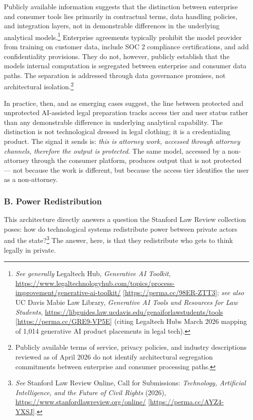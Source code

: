 \documentclass[
  12pt,
]{article}
\begin{document}
Publicly available information suggests that the distinction between
enterprise and consumer tools lies primarily in contractual terms, data
handling policies, and integration layers, not in demonstrable
differences in the underlying analytical models.\footnote{\emph{See
  generally} Legaltech Hub, \emph{Generative AI Toolkit},
  \url{https://www.legaltechnologyhub.com/topics/process-improvement/generative-ai-toolkit/}
  {[}\url{https://perma.cc/98ER-ZTT3}{]}; \emph{see also} UC Davis Mabie
  Law Library, \emph{Generative AI Tools and Resources for Law
  Students},
  \url{https://libguides.law.ucdavis.edu/genaiforlawstudents/tools}
  {[}\url{https://perma.cc/GRE9-VP5E}{]} (citing Legaltech
  Hub\textquotesingle s March 2026 mapping of 1,014 generative AI
  product placements in legal tech).} Enterprise agreements typically
prohibit the model provider from training on customer data, include SOC
2 compliance certifications, and add confidentiality provisions. They do
not, however, publicly establish that the model\textquotesingle s
internal computation is segregated between enterprise and consumer data
paths. The separation is addressed through data governance promises, not
architectural isolation.\footnote{Publicly available terms of service,
  privacy policies, and industry descriptions reviewed as of April 2026
  do not identify architectural segregation commitments between
  enterprise and consumer processing paths.}

In practice, then, and as emerging cases suggest, the line between
protected and unprotected AI-assisted legal preparation tracks access
tier and user status rather than any demonstrable difference in
underlying analytical capability. The distinction is not technological
dressed in legal clothing; it is a credentialing product. The signal it
sends is: \emph{this is attorney work, accessed through attorney
channels, therefore the output is protected.} The same model, accessed
by a non-attorney through the consumer platform, produces output that is
not protected --- not because the work is different, but because the
access tier identifies the user as a non-attorney.

\subsubsection{B. Power Redistribution}\label{b-power-redistribution}

This architecture directly answers a question the Stanford Law Review
collection poses: how do technological systems redistribute power
between private actors and the state?\footnote{\emph{See} Stanford Law
  Review Online, Call for Submissions: \emph{Technology, Artificial
  Intelligence, and the Future of Civil Rights} (2026),
  \url{https://www.stanfordlawreview.org/online/}
  {[}\url{https://perma.cc/AYZ4-YXSJ}{]}.} The answer, here, is that
they redistribute who gets to think legally in private.
\end{document}
